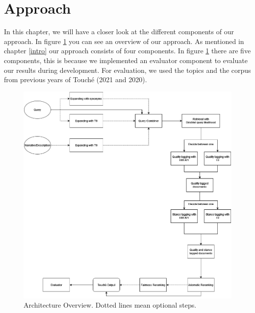 \section{Approach} \label{approach}
    In this chapter, we will have a closer look at the different components of our approach. In figure \ref{fig:pipeline} you can see an overview of our approach. As mentioned in chapter \ref{intro} our approach consists of four components. In figure \ref{fig:pipeline} there are five components, this is because we implemented an evaluator component to evaluate our results during development. For evaluation, we used the topics and the corpus from previous years of Touché (2021 and 2020).

    \begin{figure}[h]
        \centering
        \includegraphics[scale=0.4]{figures/pipeline}
        \caption{Architecture Overview. Dotted lines mean optional steps.}
        \label{fig:pipeline}
    \end{figure}

